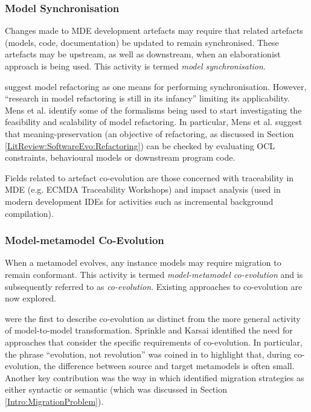 \subsubsection{Model Synchronisation}
\label{LitReview:ArtefactCoEvo}
Changes made to MDE development artefacts may require that related artefacts (models, code, documentation) be updated to remain synchronised. These artefacts may be upstream, as well as downstream, when an elaborationist approach is being used. This activity is termed \textit{model synchronisation}.

\cite{mens07modelrefactoring} suggest model refactoring as one means for performing synchronisation. However, ``research in model refactoring is still in its infancy'' \cite{mens07modelrefactoring} limiting its applicability. Mens et al. identify some of the formalisms being used to start investigating the feasibility and scalability of model refactoring. In particular, Mens et al. suggest that meaning-preservation (an objective of refactoring, as discussed in Section \ref{LitReview:SoftwareEvo:Refactoring}) can be checked by evaluating OCL constraints, behavioural models or downstream program code.

Fields related to artefact co-evolution are those concerned with traceability in MDE (e.g. ECMDA Traceability Workshops) and impact analysis (used in modern development IDEs for activities such as incremental background compilation).

\subsubsection{Model-metamodel Co-Evolution}
\label{LitReview:ModelCoEvo}
When a metamodel evolves, any instance models may require migration to remain conformant. This activity is termed \textit{model-metamodel co-evolution} and is subsequently referred to as \emph{co-evolution}. Existing approaches to co-evolution are now explored.

\cite{sprinkle04domain} were the first to describe co-evolution as distinct from the more general activity of model-to-model transformation. Sprinkle and Karsai identified the need for approaches that consider the specific requirements of co-evolution. In particular, the phrase ``evolution, not revolution'' was coined in \cite{sprinkle03thesis} to highlight that, during co-evolution, the difference between source and target metamodels is often small. Another key contribution was the way in which \cite{sprinkle04domain} identified migration strategies as either syntactic or semantic (which was discussed in Section \ref{Intro:MigrationProblem}).

